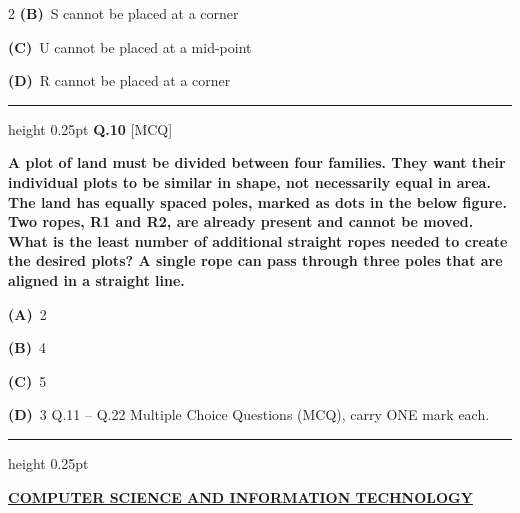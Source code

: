 \documentclass[a4paper,10pt,twoside]{article}
\begin{document}
\begin{multicols}{2}
\textbf{(B)}~S cannot be placed at a corner\par\vspace{2pt}\noindent
\textbf{(C)}~U cannot be placed at a mid-point\par\vspace{2pt}\noindent
\textbf{(D)}~R cannot be placed at a corner
\par\vspace{6pt}\hrule height 0.25pt\vspace{6pt}
\noindent\textbf{Q.10} \hfill {\footnotesize\textsf{[MCQ]}}
\par\vspace{2pt}
{\bfseries A plot of land must be divided between four families. They want their
individual plots to be similar in shape, not necessarily equal in area. The land
has equally spaced poles, marked as dots in the below figure. Two ropes, R1 and
R2, are already present and cannot be moved.
What is the least number of additional straight ropes needed to create the
desired plots? A single rope can pass through three poles that are aligned in a
straight line. \par}
\par\vspace{2pt}\noindent
\textbf{(A)}~2\par\vspace{2pt}\noindent
\textbf{(B)}~4\par\vspace{2pt}\noindent
\textbf{(C)}~5\par\vspace{2pt}\noindent
\textbf{(D)}~3 \newline Q.11 -- Q.22 Multiple Choice Questions (MCQ), carry ONE mark each.
\par\vspace{6pt}\hrule height 0.25pt\vspace{6pt}

\vspace{8pt}
\noindent\textbf{\large\underline{COMPUTER SCIENCE AND INFORMATION TECHNOLOGY}}\\[2pt]
\vspace{4pt}


\end{multicols}
\end{document}
